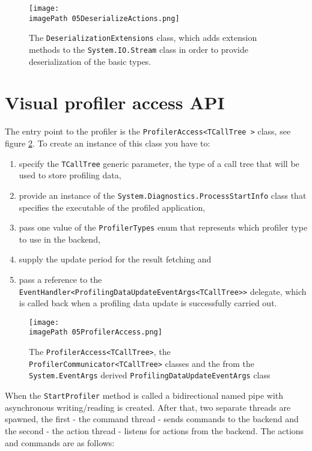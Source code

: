 \begin{figure}
	\centering
		\texttt{[image: \\imagePath 05DeserializeActions.png]}
		\caption{The \texttt{DeserializationExtensions} class, which adds extension methods to the \texttt{System.IO.Stream} class in order to provide deserialization of the basic types. }
	\label{fig:05DeserializeActions}
\end{figure}

\section{Visual profiler access API}
The entry point to the profiler is the \texttt{ProfilerAccess\textless TCallTree \textgreater} class, see figure \ref{fig:05ProfilerAccess}. To create an instance of this class you have to:
\begin{enumerate}

\item specify the \texttt{TCallTree} generic parameter, the type of a call tree that will be used to store profiling data,

\item provide an instance of the \texttt{System.Diagnostics.ProcessStartInfo} class that specifies the executable of the profiled application,

\item pass one value of the \texttt{ProfilerTypes} enum that represents which profiler type to use in the backend,

\item supply the update period for the result fetching and

\item pass a reference to the \texttt{EventHandler\textless ProfilingDataUpdateEventArgs\textless TCallTree\textgreater\textgreater} delegate, which is called back when a profiling data update is successfully carried out.
 
\end{enumerate}
\begin{figure}
	\centering
		\texttt{[image: \\imagePath 05ProfilerAccess.png]}
		\caption{The \texttt{ProfilerAccess\textless TCallTree\textgreater},
the \texttt{ProfilerCommunicator\textless TCallTree\textgreater} 		
		 classes and the from the \texttt{System.EventArgs} derived \texttt{ProfilingDataUpdateEventArgs} class}
	\label{fig:05ProfilerAccess}
\end{figure}

When the \texttt{StartProfiler} method is called a bidirectional named pipe with asynchronous writing/reading is created. After that, two separate threads are spawned, the first - the command thread - sends commands to the backend and the second - the action thread - listens for actions from the backend. The actions and commands are as follows:

